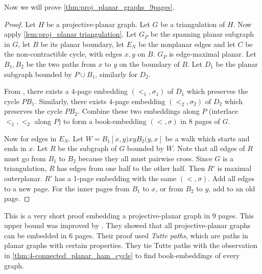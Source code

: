Now we will prove \cref{thm:proj_planar_graphs_9pages}.
\begin{proof}
    Let $H$ be a projective-planar graph. Let $G$ be a triangulation of $H$.
    Now apply \cref{lem:proj_planar triangulation}. Let $G_P$ be the spanning planar subgraph in $G$, let $B$ be its planar boundary, let $E_N$ be the nonplanar edges and let $C$ be the non-contractible cycle, with edges $x, y$ on $B$. $G_P$ is edge-maximal planar. Let $B_1, B_2$ be the two paths from $x$ to $y$ on the boundary of $B$. Let $D_1$ be the planar subgraph bounded by $P \cup B_1$, similarly for $D_2$. 

    From \textcite{yannakakisEmbeddingPlanarGraphs1989}, there exists a $4$-page embedding $(<_1, \sigma_1)$ of $D_1$ which preserves the cycle $P B_1$. Similarly, there exists $4$-page embedding $(<_2, \sigma_2)$ of $D_2$ which preserves the cycle $P B_2$. Combine these two embeddings along $P$ (interlace $<_1, <_2$ along $P$) to form a book-embedding $(<, \sigma)$ in $8$ pages of $G$. 

    Now for edges in $E_N$. Let $W = B_1[x, y) xy B_2(y, x]$ be a walk which starts and ends in $x$. Let $R$ be the subgraph of $G$ bounded by $W$. Note that all edges of $R$ must go from $B_1$ to $B_2$ because they all must pairwise cross. Since $G$ is a triangulation, $R$ has edges from one half to the other half. Then $R'$ is maximal outerplanar. $R'$ has a 1-page embedding with the same $(<, \sigma)$. Add all edges to a new page. For the inner pages from $B_1$ to $x$, or from $B_2$ to $y$, add to an old page. 
\end{proof}

This is a very short proof embedding a projective-planar graph in 9 pages. This upper bound was improved by \textcite{ozekiBookEmbeddingGraphs2019}. They showed that all projective-planar graphs can be embedded in 6 pages. Their proof used \textit{Tutte paths}, which are paths in planar graphs with certain properties. They tie Tutte paths with the observation in \cref{thm:4-connected_planar_ham_cycle} to find book-embeddings of every graph.  